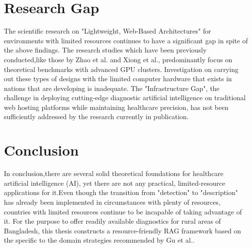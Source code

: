 \section{ Research Gap}
The scientific research on "Lightweight, Web-Based Architectures" for environments with limited resources continues to have a significant gap in spite of the above findings.
The research studies which have been previously conducted,like those by Zhao et al.  \cite{Zhao2025} and Xiong et al.\cite{Xiong2024}, predominantly focus on theoretical benchmarks with advanced GPU clusters. Investigation on carrying out these types of designs with the limited computer hardware that exists in nations that are developing is inadequate. The "Infrastructure Gap", the challenge in deploying cutting-edge diagnostic artificial intelligence on traditional web hosting platforms while maintaining healthcare precision, has not been sufficiently addressed by the research currently in publication.
\section{Conclusion}
In conclusion,there are several solid theoretical foundations for healthcare artificial intelligence (AI), yet there are not any practical, limited-resource applications for it.Even though the transition from "detection" to "description" has already been implemented in circumstances with plenty of resources, countries with limited resources continue to be incapable of taking advantage of it. For the purpose to offer readily available diagnostics for rural areas of Bangladesh, this thesis constructs a resource-friendly RAG framework based on the specific to the domain strategies recommended by Gu et al.\cite{Gu2021}.
